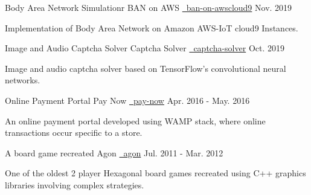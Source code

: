 \begin{cventries}
  \cventry
    {Body Area Network Simulationr}
    {BAN on AWS}
    {\href{https://github.com/mukeshmk/ban-on-awscloud9}{\faGithubSquare\ ban-on-awscloud9}}
    {Nov. 2019}
    {
      \begin{cvitems}
        \item {Implementation of Body Area Network on Amazon AWS-IoT cloud9 Instances.}
      \end{cvitems}
    }
   \cventry
    {Image and Audio Captcha Solver}
    {Captcha Solver}
    {\href{https://github.com/mukeshmk/image-audio-captcha}{\faGithubSquare\ captcha-solver}}
    {Oct. 2019}
    {
      \begin{cvitems}
        \item {Image and audio captcha solver based on TensorFlow’s convolutional neural networks.}
      \end{cvitems}
    }
  \cventry
    {Online Payment Portal}
    {Pay Now}
    {\href{https://github.com/mukeshmk/pay-now}{\faGithubSquare\ pay-now}}
    {Apr. 2016 - May. 2016}
    {
      \begin{cvitems}
        \item {An online payment portal developed using WAMP stack, where online transactions occur specific to a store.}
      \end{cvitems}
    }
  \cventry
    {A board game recreated}
    {Agon}
    {\href{https://github.com/mukeshmk/agon}{\faGithubSquare\ agon}}
    {Jul. 2011 - Mar. 2012}
    {
      \begin{cvitems}
        \item {One of the oldest 2 player Hexagonal board games recreated using C++ graphics libraries involving complex strategies.}
      \end{cvitems}
    }
\end{cventries}
